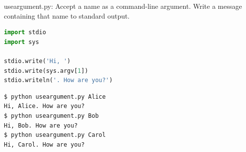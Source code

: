 \documentclass[8pt,a4paper,compress]{beamer}
\begin{document}
\begin{frame}[fragile]
\pause

\begin{framed}
\tiny useargument.py: Accept a name as a command-line argument. Write a message containing that name to standard output.
\end{framed}

\begin{lstlisting}[language=Python]
import stdio
import sys

stdio.write('Hi, ')
stdio.write(sys.argv[1])
stdio.writeln('. How are you?')
\end{lstlisting}

\pause
\begin{lstlisting}[language={}]
$ python useargument.py Alice
Hi, Alice. How are you?
$ python useargument.py Bob
Hi, Bob. How are you?
$ python useargument.py Carol
Hi, Carol. How are you?
\end{lstlisting}
\end{frame}
\end{document}
